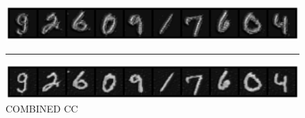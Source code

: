 \begin{figure}
    \centerline{\hspace*{8mm}\includegraphics[width=1.4\textwidth]{figures/reconstruction_MNIST_RP_ReLU_CC_epoch_100.png}}
    \caption*{\normalsize{COMBINED CC}}
    \rule{0.4\textwidth}{.4pt}
    
    \centerline{\hspace*{8mm}\includegraphics[width=1.4\textwidth]{figures/reconstruction_MNIST_COMBINED_CC_epoch_100.png}}
\end{figure}




